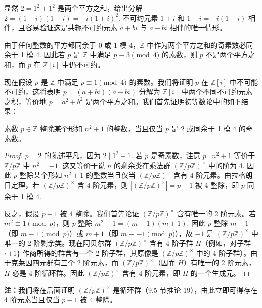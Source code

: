 显然 \(2 = 1^2+1^2\) 是两个平方之和，给出分解 \(2 = (1+i)(1-i) = -i(1+i)^2\). 不可约元素 \(1+i\) 和 \(1-i = -i(1+i)\) 相伴，且容易验证这是共轭不可约元素 \(a+bi\) 与 \(a-bi\) 相伴的唯一情形。

由于任何整数的平方都同余于 0 或 1 模 4，\(\mathbb{Z}\) 中作为两个平方之和的奇素数必同余于 1 模 4. 因此若 \(p\) 是 \(\mathbb{Z}\) 中满足 \(p \equiv 3 \pmod 4\) 的素数，则 \(p\) 不是两个平方之和，而 \(p\) 在 \(\mathbb{Z}[i]\) 中仍不可约。

现在假设 \(p\) 是 \(\mathbb{Z}\) 中满足 \(p \equiv 1 \pmod 4\) 的素数。我们将证明 \(p\) 在 \(\mathbb{Z}[i]\) 中不可能不可约，这将表明 \(p = (a+bi)(a-bi)\) 分解为 \(\mathbb{Z}[i]\) 中两个不同不可约元素之积，等价地 \(p = a^2+b^2\) 是两个平方之和。我们首先证明初等数论中的如下结果：

\begin{lemma}\label{lem:8.17}
素数 \(p \in \mathbb{Z}\) 整除某个形如 \(n^2+1\) 的整数，当且仅当 \(p\) 是 2 或同余于 1 模 4 的奇素数。
\end{lemma}

\begin{proof}
\(p = 2\) 的陈述平凡，因为 \(2 \mid 1^2+1\). 若 \(p\) 是奇素数，注意 \(p \mid n^2+1\) 等价于 \(\mathbb{Z}/p\mathbb{Z}\) 中 \(n^2 = -1\). 这又等价于说 \(n\) 的剩余类在乘法群 \((\mathbb{Z}/p\mathbb{Z})^\times\) 中的阶为 4. 因此 \(p\) 整除某个形如 \(n^2+1\) 的整数当且仅当 \((\mathbb{Z}/p\mathbb{Z})^\times\) 含有 4 阶元素。由拉格朗日定理，若 \((\mathbb{Z}/p\mathbb{Z})^\times\) 含 4 阶元素，则 \(|(\mathbb{Z}/p\mathbb{Z})^\times| = p-1\) 被 4 整除，即 \(p\) 同余于 1 模 4.

反之，假设 \(p-1\) 被 4 整除。我们首先论证 \((\mathbb{Z}/p\mathbb{Z})^\times\) 含有唯一的 2 阶元素。若 \(m^2 \equiv 1 \pmod p\)，则 \(p\) 整除 \(m^2-1 = (m-1)(m+1)\). 因此 \(p\) 整除 \(m-1\)（即 \(m \equiv 1 \pmod p\)）或 \(m+1\)（即 \(m \equiv -1 \pmod p\)），故 \(-1\) 是 \((\mathbb{Z}/p\mathbb{Z})^\times\) 中唯一的 2 阶剩余类。现在阿贝尔群 \((\mathbb{Z}/p\mathbb{Z})^\times\) 含有 4 阶子群 \(H\)（例如，对子群 \(\{\pm 1\}\) 作商所得的群含有一个 2 阶子群，其原像是 \((\mathbb{Z}/p\mathbb{Z})^\times\) 中的 4 阶子群）。由于克莱因四元群有三个 2 阶元素，而 \((\mathbb{Z}/p\mathbb{Z})^\times\)（因而 \(H\)）有唯一的 2 阶元素，\(H\) 必是 4 阶循环群。因此 \((\mathbb{Z}/p\mathbb{Z})^\times\) 含有 4 阶元素，即 \(H\) 的一个生成元。
\end{proof}

\textbf{注：}我们将在后面证明 \((\mathbb{Z}/p\mathbb{Z})^\times\) 是循环群（9.5 节推论 19），由此立即可得存在 4 阶元素当且仅当 \(p-1\) 被 4 整除。

